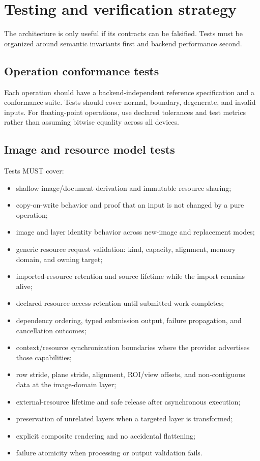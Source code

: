 \documentclass[11pt,a4paper,oneside]{article}
\begin{document}
\section{Testing and verification strategy}

The architecture is only useful if its contracts can be falsified. Tests must be organized around semantic invariants first and backend performance second.

\subsection{Operation conformance tests}

Each operation should have a backend-independent reference specification and a conformance suite. Tests should cover normal, boundary, degenerate, and invalid inputs. For floating-point operations, use declared tolerances and test metrics rather than assuming bitwise equality across all devices.

\subsection{Image and resource model tests}

Tests MUST cover:
\begin{itemize}
  \item shallow image/document derivation and immutable resource sharing;
  \item copy-on-write behavior and proof that an input is not changed by a pure operation;
  \item image and layer identity behavior across new-image and replacement modes;
  \item generic resource request validation: kind, capacity, alignment, memory domain, and owning target;
  \item imported-resource retention and source lifetime while the import remains alive;
  \item declared resource-access retention until submitted work completes;
  \item dependency ordering, typed submission output, failure propagation, and cancellation outcomes;
  \item context/resource synchronization boundaries where the provider advertises those capabilities;
  \item row stride, plane stride, alignment, ROI/view offsets, and non-contiguous data at the image-domain layer;
  \item external-resource lifetime and safe release after asynchronous execution;
  \item preservation of unrelated layers when a targeted layer is transformed;
  \item explicit composite rendering and no accidental flattening;
  \item failure atomicity when processing or output validation fails.
\end{itemize}
\end{document}

